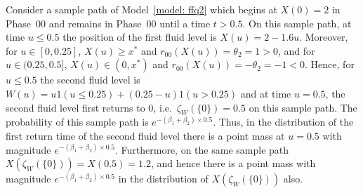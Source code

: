Consider a sample path of Model~\ref{model: ffq2} which begins at \(X(0)=2\) in Phase~\(00\) and remains in Phase~\(00\) until a time \(t>0.5\). On this sample path, at time \(u\leq 0.5\) the position of the first fluid level is \(X(u)=2-1.6u\). Moreover, for \(u\in[0,0.25]\), \(X(u)\geq x^*\) and \(r_{00}(X(u))=\theta_2=1>0\), and for \(u\in(0.25,0.5]\), \(X(u)\in(0,x^*)\) and \(r_{00}(X(u))=-\theta_2=-1<0\). Hence, for \(u\leq 0.5\) the second fluid level is \(W(u)=u1(u\leq 0.25)+(0.25-u)1(u>0.25)\) and at time \(u=0.5\), the second fluid level first returns to \(0\), i.e.~\(\zeta_{W}(\{0\})=0.5\) on this sample path. The probability of this sample path is \(e^{-(\beta_1+\beta_2)\times 0.5}\). Thus, in the distribution of the first return time of the second fluid level there is a point mass at \(u=0.5\) with magnitude \(e^{-(\beta_1+\beta_2)\times 0.5}\). Furthermore, on the same sample path \(X(\zeta_W(\{0\}))=X(0.5)=1.2\), and hence there is a point mass with magnitude \(e^{-(\beta_1+\beta_2)\times 0.5}\) in the distribution of \(X(\zeta_W(\{0\}))\) also. 

